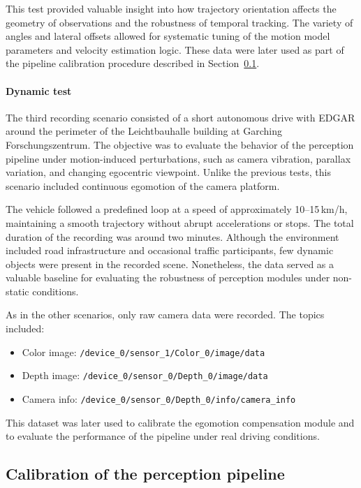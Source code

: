 This test provided valuable insight into how trajectory orientation affects the 
geometry of observations and the robustness of temporal tracking. The variety of 
angles and lateral offsets allowed for systematic tuning of the motion model 
parameters and velocity estimation logic. These data were later used as part of 
the pipeline calibration procedure described in Section~\ref{sec:FramosCalibration}.


\paragraph{Dynamic test}\label{sec:FramosDynamicTest}

The third recording scenario consisted of a short autonomous drive 
with EDGAR around the perimeter of the Leichtbauhalle building at 
Garching Forschungszentrum. The objective was to evaluate the behavior 
of the perception pipeline under motion-induced perturbations, such as 
camera vibration, parallax variation, and changing egocentric viewpoint. 
Unlike the previous tests, this scenario included continuous egomotion 
of the camera platform.

The vehicle followed a predefined loop at a speed of approximately 
10–15\,km/h, maintaining a smooth trajectory without abrupt 
accelerations or stops. The total duration of the recording was around 
two minutes. Although the environment included road infrastructure 
and occasional traffic participants, few dynamic objects were present 
in the recorded scene. Nonetheless, the data served as a valuable 
baseline for evaluating the robustness of perception modules under 
non-static conditions.

As in the other scenarios, only raw camera data were recorded. The 
topics included:

\begin{itemize}
  \item Color image: 
    \texttt{/device\_0/sensor\_1/Color\_0/image/data}
  \item Depth image: 
    \texttt{/device\_0/sensor\_0/Depth\_0/image/data}
  \item Camera info: 
    \texttt{/device\_0/sensor\_0/Depth\_0/info/camera\_info}
\end{itemize}

This dataset was later used to calibrate the egomotion compensation 
module and to evaluate the performance of the pipeline under real driving 
conditions. 

\subsection{Calibration of the perception pipeline}\label{sec:FramosCalibration}

